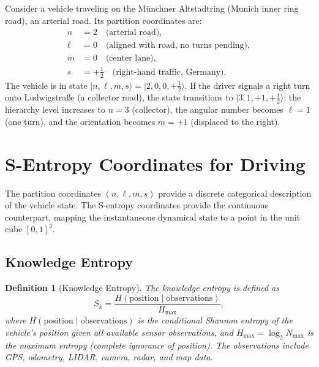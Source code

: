 \documentclass[twocolumn,10pt]{article}
\newtheorem{definition}[theorem]{Definition}
\newcommand{\Nmax}{N_{\mathrm{max}}}
\newcommand{\Sk}{S_k}
\newcommand{\Hmax}{H_{\mathrm{max}}}
\begin{document}
Consider a vehicle traveling on the M\"{u}nchner Altstadtring (Munich inner ring road), an arterial road. Its partition coordinates are:
\begin{align}
n &= 2 \quad \text{(arterial road)}, \nonumber\\
\ell &= 0 \quad \text{(aligned with road, no turns pending)}, \nonumber\\
m &= 0 \quad \text{(center lane)}, \nonumber\\
s &= +\tfrac{1}{2} \quad \text{(right-hand traffic, Germany)}.
\end{align}
The vehicle is in state $|n, \ell, m, s\rangle = |2, 0, 0, +\frac{1}{2}\rangle$. If the driver signals a right turn onto Ludwigstra\ss{}e (a collector road), the state transitions to $|3, 1, +1, +\frac{1}{2}\rangle$: the hierarchy level increases to $n = 3$ (collector), the angular number becomes $\ell = 1$ (one turn), and the orientation becomes $m = +1$ (displaced to the right).




\section{S-Entropy Coordinates for Driving}\label{sec:sentropy}

The partition coordinates $(n, \ell, m, s)$ provide a discrete categorical description of the vehicle state. The S-entropy coordinates provide the continuous counterpart, mapping the instantaneous dynamical state to a point in the unit cube $[0,1]^3$.

\subsection{Knowledge Entropy}

\begin{definition}[Knowledge Entropy]\label{def:Sk}
The knowledge entropy is defined as
\begin{equation}\label{eq:Sk}
\Sk = \frac{H(\text{position} \mid \text{observations})}{\Hmax},
\end{equation}
where $H(\text{position} \mid \text{observations})$ is the conditional Shannon entropy \cite{shannon1948, cover2006} of the vehicle's position given all available sensor observations, and $\Hmax = \log_2 \Nmax$ is the maximum entropy (complete ignorance of position). The observations include GPS, odometry, LIDAR, camera, radar, and map data.
\end{definition}
\end{document}

